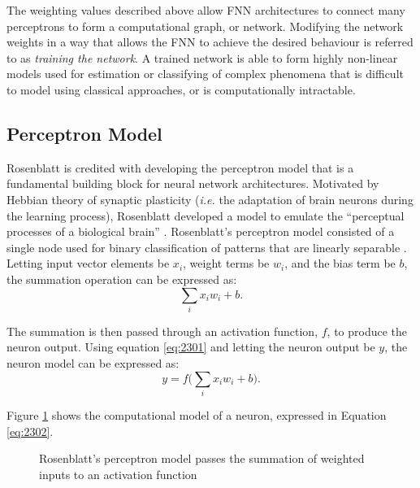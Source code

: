 The weighting values described above allow FNN architectures to connect many perceptrons to form a computational graph, or network. Modifying the network weights in a way that allows the FNN to achieve the desired behaviour is referred to as \textit{training the network}. A trained network is able to form highly non-linear models used for estimation or classifying of complex phenomena that is difficult to model using classical approaches, or is computationally intractable.



\subsection{Perceptron Model}\label{sec:perceptron_model}
Rosenblatt is credited with developing the perceptron model that is a fundamental building block for neural network architectures. Motivated by Hebbian theory of synaptic plasticity (\textit{i.e.} the adaptation of brain neurons during the learning process), Rosenblatt developed a model to emulate the ``perceptual processes of a biological brain'' \cite{Rosenblatt1957}. Rosenblatt's perceptron model consisted of a single node used for binary classification of patterns that are linearly separable \cite{Rosenblatt1958}. %
Letting input vector elements be $x_i$, weight terms be $w_i$, and the bias term be $b$, the summation operation can be expressed as:
\begin{equation}
	\sum_{i}x_i w_i + b. \label{eq:2301}
\end{equation} 

The summation is then passed through an activation function, $f$, to produce the neuron output. Using equation \ref{eq:2301} and letting the neuron output be $y$, the neuron model can be expressed as:
\begin{equation}
	y = f\bigg( \sum_{i}x_i w_i + b \bigg). \label{eq:2302}
\end{equation}

Figure \ref{fig:2301_perceptron_model} shows the computational model of a neuron, expressed in Equation \ref{eq:2302}.

\begin{figure}[h]
	\centering
	
	\caption[Computational model of a perceptron]{Rosenblatt's perceptron model passes the summation of weighted inputs to an activation function}
	\label{fig:2301_perceptron_model}
\end{figure}


